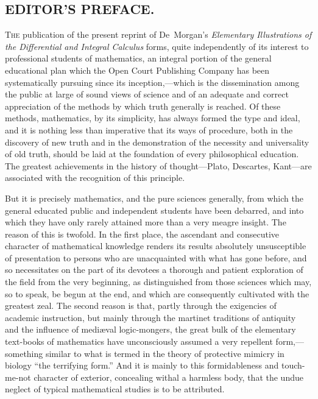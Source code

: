 \documentclass[12pt]{book}[2005/09/16]
\newlength{\TmpLen}
\newcommand{\ToCAnchor}{}
\newcommand{\ToCLine}[2]{%
  \label{toc:#1}%
  \ifthenelse{\not\equal{\pageref{toc:#1}}{\ToCAnchor}}{%
    \renewcommand{\ToCAnchor}{\pageref{toc:#1}}%
    \noindent\makebox[\textwidth][r]{\scriptsize \hfill PAGE}\\
  }{}%
  \settowidth{\TmpLen}{999}%
  \noindent\strut\parbox[b]{\textwidth-\TmpLen}{\small%
     \hangindent2em#2\dotfill}%
  \makebox[\TmpLen][r]{\pageref{section:#1}}%
  \smallskip
}
\newcounter{SecNo}
\newcommand{\Section}[2][]{
  \subsection*{\centering\large\normalfont\MakeUppercase{#2}}
  \refstepcounter{SecNo}
  \label{section:\theSecNo}%
  \ifthenelse{\not\equal{#1}{}}{%
    \addtocontents{toc}{\protect\ToCLine{\theSecNo}{#1}}%
  }{}
}
\newcommand{\Pagelabel}[1]{\phantomsection\label{page:#1}}
\newcommand{\PageSep}[1]{\Pagelabel{#1}\ignorespaces}
\renewcommand{\(}{{\upshape(}}
\renewcommand{\)}{{\upshape)}}
\newcommand{\First}[1]{\textsc{#1}}
\newcommand{\Title}[1]{\textit{#1}}
\begin{document}
\Section{Editor's Preface.}

\First{The} publication of the present reprint of De~Morgan's \Title{Elementary
Illustrations of the Differential and Integral Calculus}
forms, quite independently of its interest to professional
students of mathematics, an integral portion of the general educational
plan which the Open Court Publishing Company has been
systematically pursuing since its inception,---which is the dissemination
among the public at large of sound views of science and of
an adequate and correct appreciation of the methods by which
truth generally is reached. Of these methods, mathematics, by
its simplicity, has always formed the type and ideal, and it is
nothing less than imperative that its ways of procedure, both in
the discovery of new truth and in the demonstration of the necessity
and universality of old truth, should be laid at the foundation
of every philosophical education. The greatest achievements in
the history of thought---Plato, Descartes, Kant---are associated
with the recognition of this principle.

But it is precisely mathematics, and the pure sciences generally,
from which the general educated public and independent
students have been debarred, and into which they have only rarely
attained more than a very meagre insight. The reason of this is
twofold. In the first place, the ascendant and consecutive character
of mathematical knowledge renders its results absolutely unsusceptible
of presentation to persons who are unacquainted with
what has gone before, and so necessitates on the part of its devotees
a thorough and patient exploration of the field from the very
beginning, as distinguished from those sciences which may, so to
speak, be begun at the end, and which are consequently cultivated
with the greatest zeal. The second reason is that, partly through
the exigencies of academic instruction, but mainly through the
martinet traditions of antiquity and the influence of mediæval
\PageSep{vi}
logic-mongers, the great bulk of the elementary text-books of
mathematics have unconsciously assumed a very repellent form,---something
similar to what is termed in the theory of protective
mimicry in biology ``the terrifying form.'' And it is mainly to
this formidableness and touch-me-not character of exterior, concealing
withal a harmless body, that the undue neglect of typical
mathematical studies is to be attributed.
\end{document}

